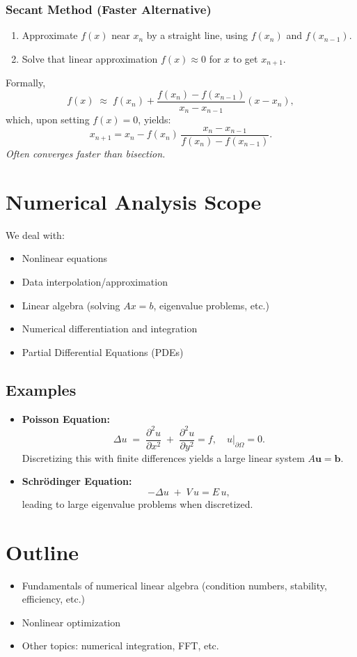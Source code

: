 \documentclass[12pt]{article}
\begin{document}
\subsubsection*{Secant Method (Faster Alternative)}
\begin{enumerate}
    \item Approximate $f(x)$ near $x_n$ by a straight line, using $f(x_n)$ and $f(x_{n-1})$.
    \item Solve that linear approximation $f(x) \approx 0$ for $x$ to get $x_{n+1}$.
\end{enumerate}
Formally,
\[
f(x) \;\approx\; f(x_n) + \frac{f(x_n) - f(x_{n-1})}{x_n - x_{n-1}} (x - x_n),
\]
which, upon setting $f(x) = 0$, yields:
\[
x_{n+1} 
= x_n 
- f(x_n)\,\frac{x_n - x_{n-1}}{f(x_n) - f(x_{n-1})}.
\]
\textit{Often converges faster than bisection.}

\section*{Numerical Analysis Scope}

We deal with:
\begin{itemize}
    \item Nonlinear equations
    \item Data interpolation/approximation
    \item Linear algebra (solving $A x = b$, eigenvalue problems, etc.)
    \item Numerical differentiation and integration
    \item Partial Differential Equations (PDEs)
\end{itemize}

\subsection*{Examples}
\begin{itemize}
    \item \textbf{Poisson Equation:}
    \[
      \Delta u \;=\; \frac{\partial^2 u}{\partial x^2} 
      \;+\; \frac{\partial^2 u}{\partial y^2} 
      = f,\quad u\big|_{\partial \Omega} = 0.
    \]
    Discretizing this with finite differences yields a large linear system $A\mathbf{u} = \mathbf{b}$.
    \item \textbf{Schr\"odinger Equation:}
    \[
      -\Delta u \;+\; V\,u = E\,u,
    \]
    leading to large eigenvalue problems when discretized.
\end{itemize}

\section*{Outline}
\begin{itemize}
    \item Fundamentals of numerical linear algebra (condition numbers, stability, efficiency, etc.)
    \item Nonlinear optimization
    \item Other topics: numerical integration, FFT, etc.
\end{itemize}
\end{document}
